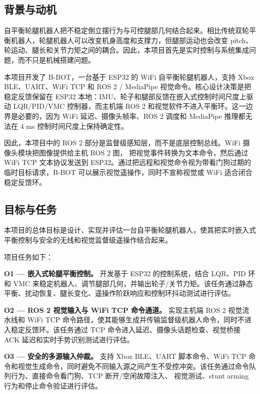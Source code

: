 \documentclass[12pt, a4paper]{article}
\begin{document}
\subsection{背景与动机}

自平衡轮腿机器人把不稳定倒立摆行为与可控腿部几何结合起来。相比传统双轮平衡机器人，轮腿机器人可以改变机身高度和支撑力，但腿部运动也会改变 pitch、轮运动、腿长和关节力矩之间的耦合。因此，本项目首先是实时控制与系统集成问题，而不只是机械搭建问题。

本项目开发了 B-BOT，一台基于 ESP32 的 WiFi 自平衡轮腿机器人，支持 Xbox BLE、UART、WiFi TCP 和 ROS 2 / MediaPipe 视觉命令。核心设计决策是把稳定反馈保留在 ESP32 本地：IMU、轮子和腿部反馈在嵌入式控制时间尺度上驱动 LQR/PID/VMC 控制器，而主机端 ROS 2 和视觉软件不进入平衡环。这一边界是必要的，因为 WiFi 延迟、摄像头帧率、ROS 2 调度和 MediaPipe 推理都无法在 4 ms 控制时间尺度上保持确定性。

因此，本项目中的 ROS 2 部分是监督级感知层，而不是底层控制总线。WiFi 摄像头模块把图像提供给主机 ROS 2 图，\texttt{} 把视觉事件转换为文本命令，然后通过 WiFi TCP 文本协议发送到 ESP32。通过把远程和视觉命令视为带看门狗过期的临时目标请求，B-BOT 可以展示视觉遥操作，同时不宣称视觉或 WiFi 适合闭合稳定反馈环。

\subsection{目标与任务}

本项目的总体目标是设计、实现并评估一台自平衡轮腿机器人，使其把实时嵌入式平衡控制与安全的无线和视觉监督级遥操作结合起来。

项目任务如下：

\textbf{O1 — 嵌入式轮腿平衡控制。}
开发基于 ESP32 的控制系统，结合 LQR、PID 环和 VMC 来稳定机器人、调节腿部几何，并输出轮子/关节力矩。该任务通过静态平衡、扰动恢复、腿长变化、遥操作阶跃响应和控制环抖动测试进行评估。

\textbf{O2 — ROS 2 视觉输入与 WiFi TCP 命令通道。}
实现主机端 ROS 2 视觉流水线和 WiFi TCP 命令路径，使其能够生成并传输监督级机器人命令，同时不进入稳定反馈环。该任务通过 TCP 命令进入延迟、摄像头话题检查、视觉桥接 ACK 延迟和实时手势识别测试进行评估。

\textbf{O3 — 安全的多源输入仲裁。}
支持 Xbox BLE、UART 脚本命令、WiFi TCP 命令和视觉生成命令，同时避免不同输入源之间产生不受控冲突。该任务通过命令队列行为、直接命令看门狗、TCP 断开/空闲故障注入、\texttt{} 视觉测试、stunt arming 行为和停止命令验证进行评估。
\end{document}
